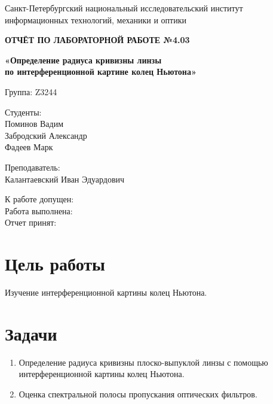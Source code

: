 \documentclass[12pt,a4paper]{article}
\begin{document}
\begin{titlepage}
\begin{center}
Санкт-Петербургский национальный исследовательский институт\\
информационных технологий, механики и оптики

\vspace{3cm}

{\Large\bfseries ОТЧЁТ ПО ЛАБОРАТОРНОЙ РАБОТЕ №4.03}

\vspace{0.5cm}

{\large\bfseries «Определение радиуса кривизны линзы\\
по интерференционной картине колец Ньютона»}

\vspace{2.5cm}
\end{center}

\begin{flushleft}
Группа: Z3244

Студенты:\\
Поминов Вадим\\
Забродский Александр\\
Фадеев Марк

Преподаватель:\\
Калантаевский Иван Эдуардович
\end{flushleft}

\vfill

\begin{flushleft}
К работе допущен:\\[0.4cm]
Работа выполнена:\\[0.4cm]
Отчет принят:
\end{flushleft}

\end{titlepage}

\section{Цель работы}

Изучение интерференционной картины колец Ньютона.

\section{Задачи}

\begin{enumerate}
    \item Определение радиуса кривизны плоско-выпуклой линзы с помощью интерференционной картины колец Ньютона.
    \item Оценка спектральной полосы пропускания оптических фильтров.
\end{enumerate}
\end{document}
